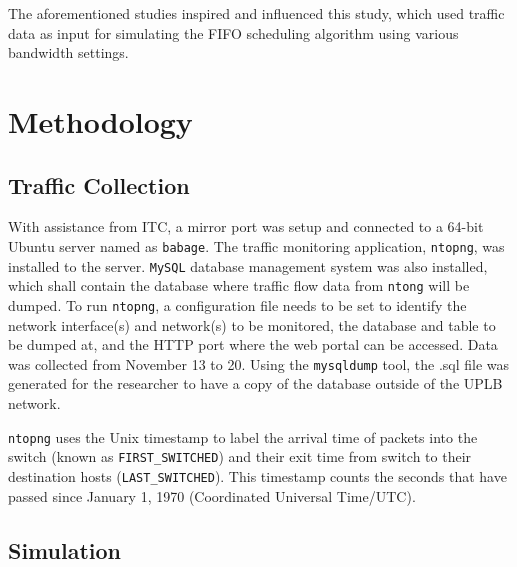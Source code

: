 \documentclass[journal]{IEEE/IEEEtran}
\begin{document}
The aforementioned studies inspired and influenced this study, which used traffic data as input for simulating the FIFO scheduling algorithm using various bandwidth settings.%

\section{Methodology}
\subsection{Traffic Collection}
With assistance from ITC, a mirror port was setup and connected to a 64-bit Ubuntu server named as \texttt{babage}. The traffic monitoring application, \texttt{ntopng}, was installed to the server. \texttt{MySQL} database management system was also installed, which shall contain the database where traffic flow data from \texttt{ntong} will be dumped. To run \texttt{ntopng}, a configuration file needs to be set to identify the network interface(s) and network(s) to be monitored, the database and table to be dumped at, and the HTTP port where the web portal can be accessed. Data was collected from November 13 to 20. Using the \texttt{mysqldump} tool, the .sql file was generated for the researcher to have a copy of the database outside of the UPLB network. 

\texttt{ntopng} uses the Unix timestamp to label the arrival time of packets into the switch (known as \texttt{FIRST\_SWITCHED}) and their exit time from switch to their destination hosts (\texttt{LAST\_SWITCHED}). This timestamp counts the seconds that have passed since January 1, 1970 (Coordinated Universal Time/UTC).

\subsection{Simulation}
\end{document}
